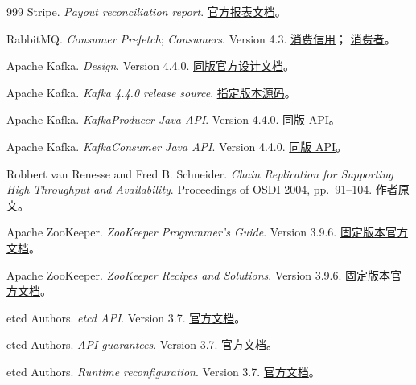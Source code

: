 \begin{thebibliography}{999}
Stripe.
\textit{Payout reconciliation report}.
\href{https://docs.stripe.com/reports/payout-reconciliation}{官方报表文档}。

RabbitMQ.
\textit{Consumer Prefetch}; \textit{Consumers}. Version 4.3.
\href{https://www.rabbitmq.com/docs/consumer-prefetch}{消费信用}；
\href{https://www.rabbitmq.com/docs/consumers}{消费者}。

Apache Kafka.
\textit{Design}. Version 4.4.0.
\href{https://kafka.apache.org/44/design/design/}{同版官方设计文档}。

Apache Kafka.
\textit{Kafka 4.4.0 release source}.
\href{https://github.com/apache/kafka/tree/4.4.0}{指定版本源码}。

Apache Kafka.
\textit{KafkaProducer Java API}. Version 4.4.0.
\href{https://kafka.apache.org/44/javadoc/org/apache/kafka/clients/producer/KafkaProducer.html}{同版 API}。

Apache Kafka.
\textit{KafkaConsumer Java API}. Version 4.4.0.
\href{https://kafka.apache.org/44/javadoc/org/apache/kafka/clients/consumer/KafkaConsumer.html}{同版 API}。

Robbert van Renesse and Fred B. Schneider.
\textit{Chain Replication for Supporting High Throughput and Availability}.
Proceedings of OSDI 2004, pp.\ 91--104.
\href{https://www.cs.cornell.edu/home/rvr/papers/OSDI04.pdf}{作者原文}。

Apache ZooKeeper.
\textit{ZooKeeper Programmer's Guide}. Version 3.9.6.
\href{https://zookeeper.apache.org/doc/r3.9.6/zookeeperProgrammers.html}{固定版本官方文档}。

Apache ZooKeeper.
\textit{ZooKeeper Recipes and Solutions}. Version 3.9.6.
\href{https://zookeeper.apache.org/doc/r3.9.6/recipes.html}{固定版本官方文档}。

etcd Authors.
\textit{etcd API}. Version 3.7.
\href{https://etcd.io/docs/v3.7/learning/api/}{官方文档}。

etcd Authors.
\textit{API guarantees}. Version 3.7.
\href{https://etcd.io/docs/v3.7/learning/api_guarantees/}{官方文档}。

etcd Authors.
\textit{Runtime reconfiguration}. Version 3.7.
\href{https://etcd.io/docs/v3.7/op-guide/runtime-configuration/}{官方文档}。


\end{thebibliography}
